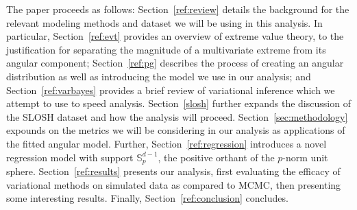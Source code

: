 The paper proceeds as follows:  Section~\ref{ref:review} details the background 
    for the relevant modeling methods and dataset we will be using in this analysis.  
    In particular, Section~\ref{ref:evt} provides an overview of extreme value 
    theory, to the justification for separating the magnitude of a multivariate 
    extreme from its angular component; Section~\ref{ref:pg} describes the process 
    of creating an angular distribution as well as introducing the model we use in 
    our analysis; and Section~\ref{ref:varbayes} provides a brief review of variational
    inference which we attempt to use to speed analysis.  Section~\ref{slosh} further
    expands the discussion of the SLOSH dataset and how the analysis will proceed.
    Section~\ref{sec:methodology} expounds on the metrics we will be considering in
    our analysis as applications of the fitted angular model.  Further, 
    Section~\ref{ref:regression} introduces a novel regression model with support
    $\mathbb{S}_{p}^{d-1}$, the positive orthant of the $p$-norm unit sphere.
    Section~\ref{ref:results} presents our analysis, first evaluating the efficacy of
    variational methods on simulated data as compared to MCMC, then
    presenting some interesting results. Finally, Section~\ref{ref:conclusion} 
    concludes.

